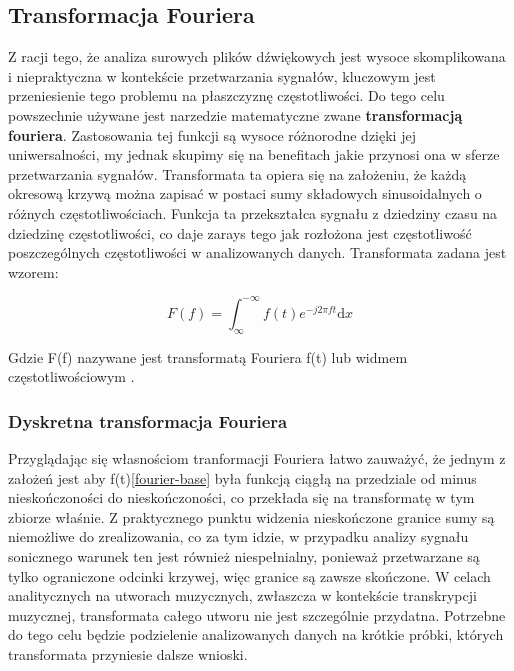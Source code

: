 \documentclass[12pt,a4paper,twoside]{mwart}
\begin{document}
\subsection{Transformacja Fouriera}\label{sec:TF}
Z racji tego, że analiza surowych plików dźwiękowych jest wysoce skomplikowana i niepraktyczna w kontekście przetwarzania sygnałów, kluczowym jest przeniesienie tego problemu na płaszczyznę częstotliwości. Do tego celu powszechnie używane jest narzedzie matematyczne zwane \textbf{transformacją fouriera}. Zastosowania tej funkcji są wysoce różnorodne dzięki jej uniwersalności, my jednak skupimy się na benefitach jakie przynosi ona w sferze przetwarzania sygnałów. Transformata ta opiera się na założeniu, że każdą okresową krzywą można zapisać w postaci sumy składowych sinusoidalnych o różnych częstotliwościach. Funkcja ta przekształca sygnału z dziedziny czasu na dziedzinę częstotliwości, co daje zarays tego jak rozłożona jest częstotliwość poszczególnych częstotliwości w analizowanych danych. Transformata zadana jest wzorem:

\begin{equation} \label{fourier-base}
F(f) = \int_{\infty}^{-\infty}\textit{f}(t)e^ {-j2\pi ft}\mathrm{d}x
\end{equation}

Gdzie F(f) nazywane jest transformatą Fouriera f(t) lub widmem częstotliwościowym \cite{TransformacjaFourieraWroc}\cite{TransformacjaFourieraAgh}.

\subsubsection{Dyskretna transformacja Fouriera} \label{sec-DTF}

Przyglądając się własnościom tranformacji Fouriera łatwo zauważyć, że jednym z założeń jest aby f(t)\ref{fourier-base} była funkcją ciągłą na przedziale od minus nieskończoności do nieskończoności, co przekłada się na transformatę w tym zbiorze właśnie. Z praktycznego punktu widzenia nieskończone granice sumy są niemożliwe do zrealizowania, co za tym idzie, w przypadku analizy sygnału sonicznego warunek ten jest również niespełnialny, ponieważ przetwarzane są tylko ograniczone odcinki krzywej, więc granice są zawsze skończone. W celach analitycznych na utworach muzycznych, zwłaszcza w kontekście transkrypcji muzycznej, transformata całego utworu nie jest szczególnie przydatna. Potrzebne do tego celu będzie podzielenie analizowanych danych na krótkie próbki, których transformata przyniesie dalsze wnioski.\cite{TransformacjaFourieraWroc}\cite{TransformacjaFourieraelektronikab2b}
\end{document}
